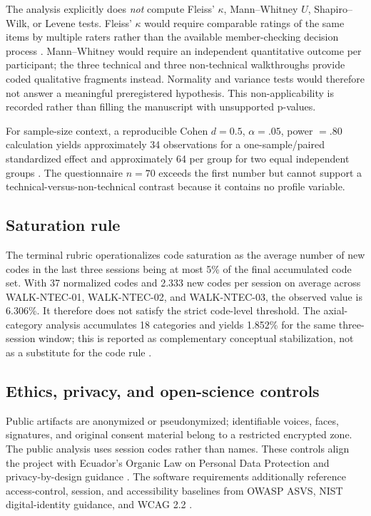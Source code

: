 \documentclass[pdflatex,sn-basic]{sn-jnl}
\begin{document}
The analysis explicitly does \emph{not} compute Fleiss' $\kappa$, Mann--Whitney $U$, Shapiro--Wilk, or Levene tests. Fleiss' $\kappa$ would require comparable ratings of the same items by multiple raters rather than the available member-checking decision process \cite{cohen1960,fleiss1971}. Mann--Whitney would require an independent quantitative outcome per participant; the three technical and three non-technical walkthroughs provide coded qualitative fragments instead. Normality and variance tests would therefore not answer a meaningful preregistered hypothesis. This non-applicability is recorded rather than filling the manuscript with unsupported p-values.

For sample-size context, a reproducible Cohen $d=0.5$, $\alpha=.05$, power $=.80$ calculation yields approximately 34 observations for a one-sample/paired standardized effect and approximately 64 per group for two equal independent groups \cite{cohen1988}. The questionnaire $n=70$ exceeds the first number but cannot support a technical-versus-non-technical contrast because it contains no profile variable.

\subsection{Saturation rule}
The terminal rubric operationalizes code saturation as the average number of new codes in the last three sessions being at most 5\% of the final accumulated code set. With 37 normalized codes and 2.333 new codes per session on average across WALK-NTEC-01, WALK-NTEC-02, and WALK-NTEC-03, the observed value is 6.306\%. It therefore does not satisfy the strict code-level threshold. The axial-category analysis accumulates 18 categories and yields 1.852\% for the same three-session window; this is reported as complementary conceptual stabilization, not as a substitute for the code rule \cite{hennink2017}.

\subsection{Ethics, privacy, and open-science controls}
Public artifacts are anonymized or pseudonymized; identifiable voices, faces, signatures, and original consent material belong to a restricted encrypted zone. The public analysis uses session codes rather than names. These controls align the project with Ecuador's Organic Law on Personal Data Protection and privacy-by-design guidance \cite{lopdp2021,spdp2025}. The software requirements additionally reference access-control, session, and accessibility baselines from OWASP ASVS, NIST digital-identity guidance, and WCAG 2.2 \cite{owasp2025,nist2025,wcag2024}.
\end{document}
